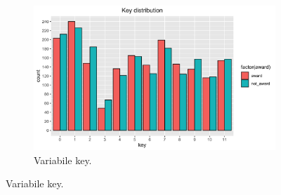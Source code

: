\begin{figure}[!h]

	\begin{subfigure}[b]{\textwidth}
		\centering
		\includegraphics[width=13cm]{../images/key_distribution.png}
		\caption{Variabile key.}
	\end{subfigure}
      

\end{figure}
